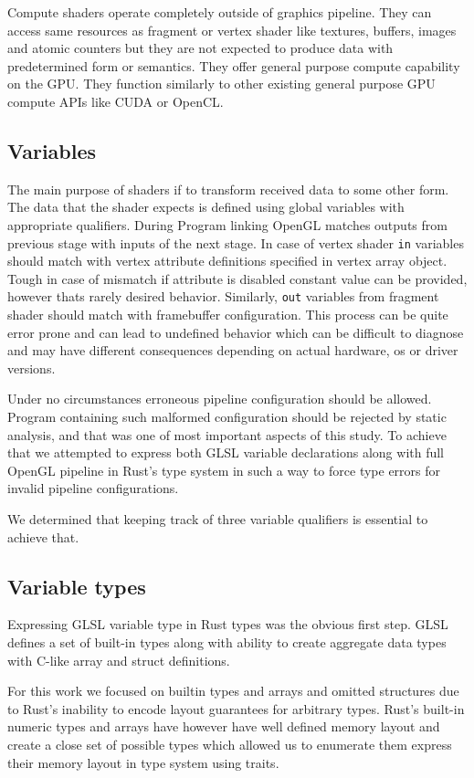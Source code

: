 Compute shaders operate completely outside of graphics pipeline. They can access same resources as fragment or vertex shader like textures, buffers, images and atomic counters
but they are not expected to produce data with predetermined form or semantics. They offer general purpose compute capability on the GPU. 
They function similarly to other existing general purpose GPU compute APIs like CUDA or OpenCL.

\subsection{Variables}

The main purpose of shaders if to transform received data to some other form. The data that the shader expects is defined using global variables with appropriate qualifiers.
During Program linking OpenGL matches outputs from previous stage with inputs of the next stage. 
In case of vertex shader \texttt{in} variables should match with vertex attribute definitions specified in vertex array object.
Tough in case of mismatch if attribute is disabled constant value can be provided, however thats rarely desired behavior.
Similarly, \texttt{out} variables from fragment shader should match with framebuffer configuration.
This process can be quite error prone and can lead to undefined behavior which can be difficult to diagnose and may have different consequences depending on actual hardware, os or driver versions.

Under no circumstances erroneous pipeline configuration should be allowed. Program containing such malformed configuration should be rejected by static analysis, and that was one of most important aspects of this study.
To achieve that we attempted to express both GLSL variable declarations along with full OpenGL pipeline in Rust's type system in such a way to force type errors for invalid pipeline configurations.

We determined that keeping track of three variable qualifiers is essential to achieve that.

\subsection{Variable types}

Expressing GLSL variable type in Rust types was the obvious first step. GLSL defines a set of built-in types along with ability to create aggregate data types with C-like array and struct definitions.

For this work we focused on builtin types and arrays and omitted structures due to Rust's inability to encode layout guarantees for arbitrary types.
Rust's built-in numeric types and arrays have however have well defined memory layout and create a close set of possible types which allowed us to enumerate them express their memory layout in type system using traits.

